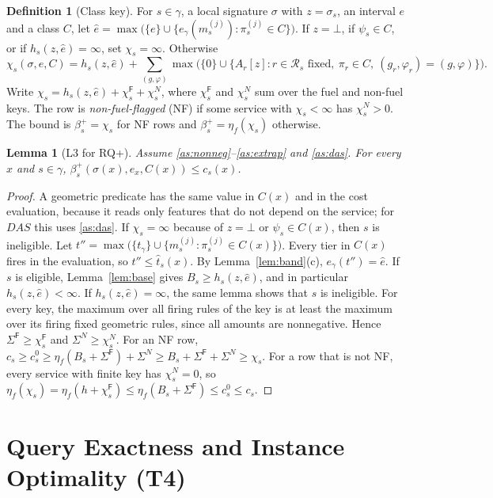 \documentclass[11pt]{article}
\newtheorem{lemma}[theorem]{Lemma}
\theoremstyle{definition}
\newtheorem{definition}[theorem]{Definition}
\theoremstyle{remark}
\newcommand{\Fu}{\mathsf{F}}
\begin{document}
\begin{definition}[Class key]\label{def:classkey}
For $s\in\gamma$, a local signature $\sigma$ with $z=\sigma_s$, an interval $e$ and a class $C$,
let $\hat e=\max\bigl(\{e\}\cup\{e_\gamma(m^{(j)}_s):\pi^{(j)}_s\in C\}\bigr)$. If $z=\bot$, if $\psi_s\in
C$, or if $h_s(z,\hat e)=\infty$, set $\chi_s=\infty$. Otherwise
\[
\chi_s(\sigma,e,C)=h_s(z,\hat e)+\sum_{(g,\varphi)}\max\bigl(\{0\}\cup\{A_r[z]: r\in\mathcal
R_s\text{ fixed},\ \pi_r\in C,\ (g_r,\varphi_r)=(g,\varphi)\}\bigr).
\]
Write $\chi_s=h_s(z,\hat e)+\chi^\Fu_s+\chi^N_s$, where $\chi^\Fu_s$ and $\chi^N_s$ sum over the
fuel and non-fuel keys. The row is \emph{non-fuel-flagged} (NF) if some service with
$\chi_s<\infty$ has $\chi^N_s>0$. The bound is $\beta^+_s=\chi_s$ for NF rows and
$\beta^+_s=\eta_f(\chi_s)$ otherwise.
\end{definition}

\begin{lemma}[L3 for RQ+]\label{lem:L3plus}
Assume \ref{as:nonneg}--\ref{as:extrap} and \ref{as:das}. For every $x$ and
$s\in\gamma$, $\beta^+_s(\sigma(x),e_x,C(x))\le c_s(x)$.
\end{lemma}
\begin{proof}
A geometric predicate has the same value in $C(x)$ and in the cost evaluation, because it
reads only features that do not depend on the service; for $\mathit{DAS}$ this uses
\ref{as:das}. If $\chi_s=\infty$ because of $z=\bot$ or $\psi_s\in C(x)$, then $s$ is
ineligible. Let $t''=\max\bigl(\{t_\gamma\}\cup\{m^{(j)}_s:\pi^{(j)}_s\in C(x)\}\bigr)$. Every tier in
$C(x)$ fires in the evaluation, so $t''\le\hat t_s(x)$. By Lemma~\ref{lem:band}(c),
$e_\gamma(t'')=\hat e$. If $s$ is eligible, Lemma~\ref{lem:base} gives $B_s\ge h_s(z,\hat e)$, and
in particular $h_s(z,\hat e)<\infty$. If $h_s(z,\hat e)=\infty$, the same lemma shows that $s$
is ineligible. For every key, the maximum over all firing rules of the key is at least
the maximum over its firing fixed geometric rules, since all amounts are nonnegative.
Hence $\Sigma^\Fu\ge\chi^\Fu_s$ and $\Sigma^N\ge\chi^N_s$. For an NF row,
$c_s\ge c^0_s\ge\eta_f(B_s+\Sigma^\Fu)+\Sigma^N\ge B_s+\Sigma^\Fu+\Sigma^N\ge\chi_s$. For a row that is
not NF, every service with finite key has $\chi^N_s=0$, so
$\eta_f(\chi_s)=\eta_f(h+\chi^\Fu_s)\le\eta_f(B_s+\Sigma^\Fu)\le c^0_s\le c_s$.
\end{proof}

\section{Query Exactness and Instance Optimality (T4)}\label{sec:T4}
\end{document}
